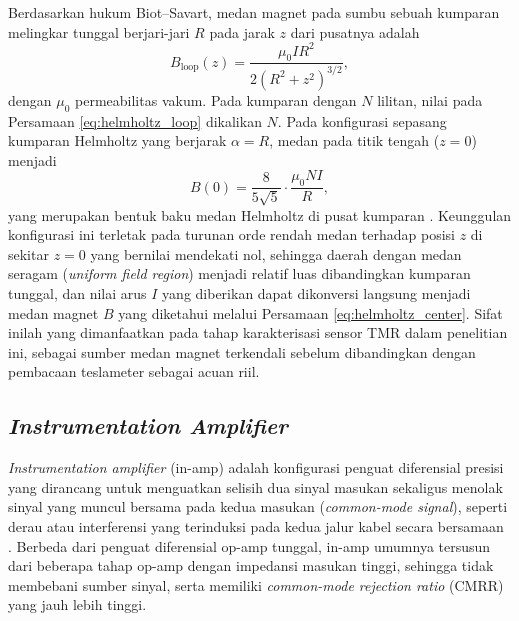 Berdasarkan hukum Biot--Savart, medan magnet pada sumbu sebuah kumparan melingkar tunggal berjari-jari $R$ pada jarak $z$ dari pusatnya adalah
\begin{equation}
B_{\text{loop}}(z) = \frac{\mu_0 I R^2}{2 (R^2+z^2)^{3/2}},
\label{eq:helmholtz_loop}
\end{equation}
dengan $\mu_0$ permeabilitas vakum. Pada kumparan dengan $N$ lilitan, nilai pada Persamaan \eqref{eq:helmholtz_loop} dikalikan $N$. Pada konfigurasi sepasang kumparan Helmholtz yang berjarak $\alpha=R$, medan pada titik tengah ($z=0$) menjadi
\begin{equation}
B(0) = \frac{8}{5\sqrt{5}} \cdot \frac{\mu_0 N I}{R},
\label{eq:helmholtz_center}
\end{equation}
yang merupakan bentuk baku medan Helmholtz di pusat kumparan \cite{zhu2023}. Keunggulan konfigurasi ini terletak pada turunan orde rendah medan terhadap posisi $z$ di sekitar $z=0$ yang bernilai mendekati nol, sehingga daerah dengan medan seragam (\textit{uniform field region}) menjadi relatif luas dibandingkan kumparan tunggal, dan nilai arus $I$ yang diberikan dapat dikonversi langsung menjadi medan magnet $B$ yang diketahui melalui Persamaan \eqref{eq:helmholtz_center}. Sifat inilah yang dimanfaatkan pada tahap karakterisasi sensor TMR dalam penelitian ini, sebagai sumber medan magnet terkendali sebelum dibandingkan dengan pembacaan teslameter sebagai acuan riil.

\subsection{\textit{Instrumentation Amplifier}}
\textit{Instrumentation amplifier} (in-amp) adalah konfigurasi penguat diferensial presisi yang dirancang untuk menguatkan selisih dua sinyal masukan sekaligus menolak sinyal yang muncul bersama pada kedua masukan (\textit{common-mode signal}), seperti derau atau interferensi yang terinduksi pada kedua jalur kabel secara bersamaan \cite{TI2019,Jung2002}. Berbeda dari penguat diferensial op-amp tunggal, in-amp umumnya tersusun dari beberapa tahap op-amp dengan impedansi masukan tinggi, sehingga tidak membebani sumber sinyal, serta memiliki \textit{common-mode rejection ratio} (CMRR) yang jauh lebih tinggi.

